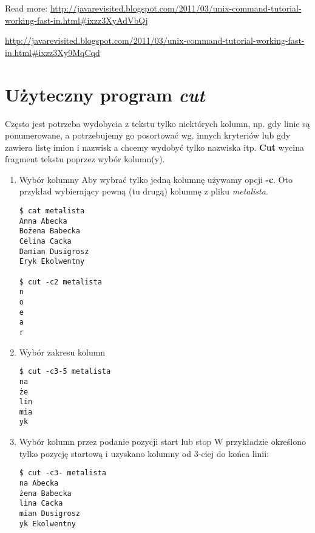 \documentclass[a4paper,titlepage,12pt]{mwart}
\begin{document}
Read more: \url{http://javarevisited.blogspot.com/2011/03/unix-command-tutorial-working-fast-in.html\#ixzz3XyAdVbQj}


\url{http://javarevisited.blogspot.com/2011/03/unix-command-tutorial-working-fast-in.html#ixzz3Xy9MqCqd}

\section{Użyteczny program \textit{cut}}
Często jest potrzeba wydobycia z tekstu tylko niektórych kolumn, np. gdy linie są ponumerowane, a potrzebujemy go posortować wg. innych kryteriów lub gdy zawiera listę imion i nazwisk a chcemy wydobyć tylko nazwiska itp. \textbf{Cut} wycina fragment tekstu poprzez wybór kolumn(y).
\begin{enumerate}
\item{Wybór kolumny}\newline
Aby wybrać tylko jedną kolumnę używamy opcji \textbf{ -c}. Oto przykład wybierający pewną (tu drugą) kolumnę z pliku \textit{metalista}.
\begin{verbatim}
$ cat metalista
Anna Abecka
Bożena Babecka
Celina Cacka
Damian Dusigrosz
Eryk Ekolwentny

$ cut -c2 metalista
n
o
e
a
r
\end{verbatim}
\item{Wybór zakresu kolumn}
\begin{verbatim}
$ cut -c3-5 metalista
na 
że
lin
mia
yk 
\end{verbatim}
\item{Wybór kolumn przez podanie pozycji start lub stop}\newline
W przykładzie określono tylko pozycję startową i uzyskano kolumny od 3-ciej do końca linii:
\begin{verbatim}
$ cut -c3- metalista
na Abecka
żena Babecka
lina Cacka
mian Dusigrosz
yk Ekolwentny
\end{verbatim}


\end{enumerate}
\end{document}
